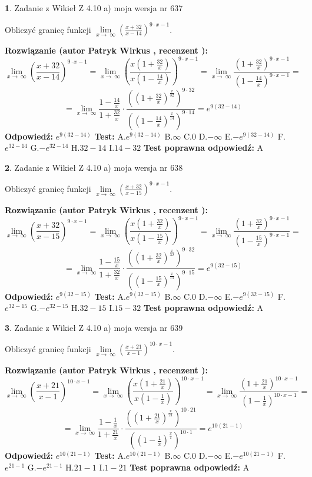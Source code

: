 \documentclass[12pt, a4paper]{article}
\theoremstyle{definition} %
\newtheorem{zad}{}
\newcommand{\zadStart}[1]{\begin{zad}#1\newline}
\newcommand{\zadStop}{\end{zad}}
\newcommand{\rozwStart}[2]{\noindent \textbf{Rozwiązanie (autor #1 , recenzent #2): }\newline}
\newcommand{\rozwStop}{\newline}
\newcommand{\odpStart}{\noindent \textbf{Odpowiedź:}\newline}
\newcommand{\odpStop}{\newline}
\newcommand{\testStart}{\noindent \textbf{Test:}\newline}
\newcommand{\testStop}{\newline}
\newcommand{\kluczStart}{\noindent \textbf{Test poprawna odpowiedź:}\newline}
\newcommand{\kluczStop}{\newline}
\begin{document}
\zadStart{Zadanie z Wikieł Z 4.10 a) moja wersja nr 637}


Obliczyć granicę funkcji  $\lim\limits_{x\to\ \infty}(\frac{x+32}{x-14})^{9\cdot x-1}$.
\zadStop
\rozwStart{Patryk Wirkus}{}
$$\lim\limits_{x\to\ \infty}(\frac{x+32}{x-14})^{9\cdot x-1} = \lim\limits_{x\to\ \infty}(\frac{x(1+\frac{32}{x})}{x(1-\frac{14}{x})})^{9\cdot x-1}=\lim\limits_{x\to\ \infty}\frac{(1+\frac{32}{x})^{9\cdot x-1}}{(1-\frac{14}{x})^{9\cdot x-1}}=$$
$$=\lim\limits_{x\to\ \infty}\frac{1-\frac{14}{x}}{1+\frac{32}{x}}\cdot\frac{((1+\frac{32}{x})^{\frac{x}{32}})^{9\cdot32}}{((1-\frac{14}{x})^{\frac{x}{14}})^{9\cdot14}}=e^{9(32-14)}$$
\rozwStop
\odpStart
$e^{9(32-14)}$
\odpStop
\testStart
A.$e^{9(32-14)}$ B.$\infty$ C.$0$ D.$-\infty$ E.$-e^{9(32-14)}$
F.$e^{32-14}$ G.$-e^{32-14}$
H.$32-14$
I.$14-32$
\testStop
\kluczStart
A
\kluczStop



\zadStart{Zadanie z Wikieł Z 4.10 a) moja wersja nr 638}


Obliczyć granicę funkcji  $\lim\limits_{x\to\ \infty}(\frac{x+32}{x-15})^{9\cdot x-1}$.
\zadStop
\rozwStart{Patryk Wirkus}{}
$$\lim\limits_{x\to\ \infty}(\frac{x+32}{x-15})^{9\cdot x-1} = \lim\limits_{x\to\ \infty}(\frac{x(1+\frac{32}{x})}{x(1-\frac{15}{x})})^{9\cdot x-1}=\lim\limits_{x\to\ \infty}\frac{(1+\frac{32}{x})^{9\cdot x-1}}{(1-\frac{15}{x})^{9\cdot x-1}}=$$
$$=\lim\limits_{x\to\ \infty}\frac{1-\frac{15}{x}}{1+\frac{32}{x}}\cdot\frac{((1+\frac{32}{x})^{\frac{x}{32}})^{9\cdot32}}{((1-\frac{15}{x})^{\frac{x}{15}})^{9\cdot15}}=e^{9(32-15)}$$
\rozwStop
\odpStart
$e^{9(32-15)}$
\odpStop
\testStart
A.$e^{9(32-15)}$ B.$\infty$ C.$0$ D.$-\infty$ E.$-e^{9(32-15)}$
F.$e^{32-15}$ G.$-e^{32-15}$
H.$32-15$
I.$15-32$
\testStop
\kluczStart
A
\kluczStop



\zadStart{Zadanie z Wikieł Z 4.10 a) moja wersja nr 639}


Obliczyć granicę funkcji  $\lim\limits_{x\to\ \infty}(\frac{x+21}{x-1})^{10\cdot x-1}$.
\zadStop
\rozwStart{Patryk Wirkus}{}
$$\lim\limits_{x\to\ \infty}(\frac{x+21}{x-1})^{10\cdot x-1} = \lim\limits_{x\to\ \infty}(\frac{x(1+\frac{21}{x})}{x(1-\frac{1}{x})})^{10\cdot x-1}=\lim\limits_{x\to\ \infty}\frac{(1+\frac{21}{x})^{10\cdot x-1}}{(1-\frac{1}{x})^{10\cdot x-1}}=$$
$$=\lim\limits_{x\to\ \infty}\frac{1-\frac{1}{x}}{1+\frac{21}{x}}\cdot\frac{((1+\frac{21}{x})^{\frac{x}{21}})^{10\cdot21}}{((1-\frac{1}{x})^{\frac{x}{1}})^{10\cdot1}}=e^{10(21-1)}$$
\rozwStop
\odpStart
$e^{10(21-1)}$
\odpStop
\testStart
A.$e^{10(21-1)}$ B.$\infty$ C.$0$ D.$-\infty$ E.$-e^{10(21-1)}$
F.$e^{21-1}$ G.$-e^{21-1}$
H.$21-1$
I.$1-21$
\testStop
\kluczStart
A
\kluczStop
\end{document}
